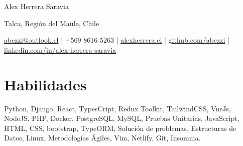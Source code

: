 \documentclass[11pt]{article}       %
\begin{document}
\centerline{\Huge Alex Herrera Saravia}

\vspace{5pt}

\centerline{Talca, Regi\'on del Maule, Chile}
\centerline{\href{mailto:abezzi@outlook.cl}{abezzi@outlook.cl} | +569 8616 5263 | \href{https://alexherrera.cl}{alexherrera.cl} | \href{https://github.com/Abezzi}{github.com/abezzi} | \href{https://linkedin.com/in/alex-herrera-saravia/}{linkedin.com/in/alex-herrera-saravia}}

\vspace{-10pt}

\section*{Habilidades}
Python, Django, React, TypesCript, Redux Toolkit, TailwindCSS, VueJs, NodeJS, PHP, Docker, PostgreSQL, MySQL, Pruebas Unitarias, JavaScript, HTML, CSS, bootstrap, TypeORM, Soluci\'on de problemas, Estructuras de Datos, Linux, Metodolog\'ias \'Agiles, Vim, Netlify, Git, Insomnia.  \\

\vspace{-6.5pt}

\end{document}

